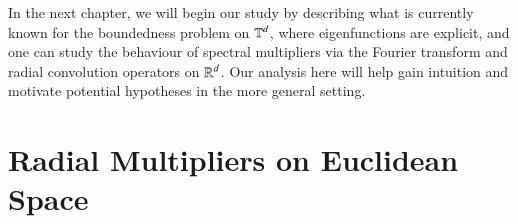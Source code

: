 
In the next chapter, we will begin our study by describing what is currently known for the boundedness problem on $\operatorname{\mathbb{T}}^d$, where eigenfunctions are explicit, and one can study the behaviour of spectral multipliers via the Fourier transform and radial convolution operators on $\operatorname{\mathbb{R}}^d$. Our analysis here will help gain intuition and motivate potential hypotheses in the more general setting.


%

%

\chapter{Radial Multipliers on Euclidean Space}

